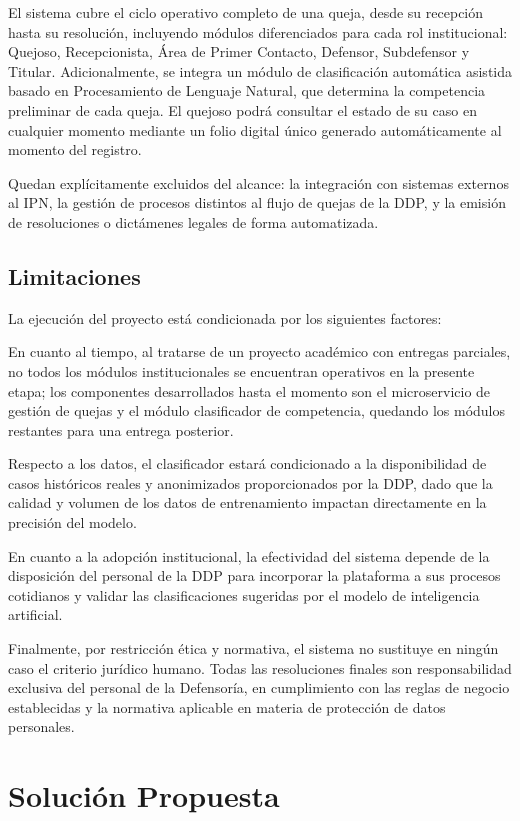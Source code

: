 El sistema cubre el ciclo operativo completo de una queja, desde su recepción hasta su resolución, incluyendo módulos diferenciados para cada rol institucional: Quejoso, Recepcionista, Área de Primer Contacto, Defensor, Subdefensor y Titular. Adicionalmente, se integra un módulo de clasificación automática asistida basado en Procesamiento de Lenguaje Natural, que determina la competencia preliminar de cada queja. El quejoso podrá consultar el estado de su caso en cualquier momento mediante un folio digital único generado automáticamente al momento del registro.

Quedan explícitamente excluidos del alcance: la integración con sistemas externos al IPN, la gestión de procesos distintos al flujo de quejas de la DDP, y la emisión de resoluciones o dictámenes legales de forma automatizada.

\subsection{Limitaciones}

La ejecución del proyecto está condicionada por los siguientes factores:

En cuanto al tiempo, al tratarse de un proyecto académico con entregas parciales, no todos los módulos institucionales se encuentran operativos en la presente etapa; los componentes desarrollados hasta el momento son el microservicio de gestión de quejas y el módulo clasificador de competencia, quedando los módulos restantes para una entrega posterior.

Respecto a los datos, el clasificador estará condicionado a la disponibilidad de casos históricos reales y anonimizados proporcionados por la DDP, dado que la calidad y volumen de los datos de entrenamiento impactan directamente en la precisión del modelo.

En cuanto a la adopción institucional, la efectividad del sistema depende de la disposición del personal de la DDP para incorporar la plataforma a sus procesos cotidianos y validar las clasificaciones sugeridas por el modelo de inteligencia artificial.

Finalmente, por restricción ética y normativa, el sistema no sustituye en ningún caso el criterio jurídico humano. Todas las resoluciones finales son responsabilidad exclusiva del personal de la Defensoría, en cumplimiento con las reglas de negocio establecidas y la normativa aplicable en materia de protección de datos personales.


\section{Solución Propuesta}

